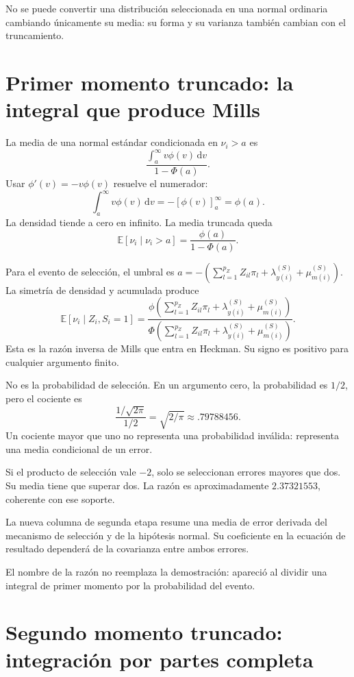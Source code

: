 \documentclass[11pt,a4paper]{article}
\newcommand{\E}{\mathbb E}
\newcommand{\dd}{\,\mathrm d}
\begin{document}
No se puede convertir una distribución
seleccionada en una normal ordinaria
cambiando únicamente su media:
su forma y su varianza
también cambian con el truncamiento.


\clearpage
\section{Primer momento truncado: la integral que produce Mills}

La media de una normal estándar
condicionada en \(\nu_i>a\) es
\[
\frac{\int_a^\infty v\phi(v)\dd v}
{1-\Phi(a)}.
\]
Usar \(\phi'(v)=-v\phi(v)\)
resuelve el numerador:
\[
\int_a^\infty v\phi(v)\dd v
=-[\phi(v)]_a^\infty=\phi(a).
\]
La densidad tiende a cero en infinito.
La media truncada queda
\[
\E[\nu_i\mid\nu_i>a]
=\frac{\phi(a)}{1-\Phi(a)}.
\]

Para el evento de selección,
el umbral es \(a=-\left(\sum_{l=1}^{p_Z}Z_{il}\pi_l+\lambda_{y(i)}^{(S)}+\mu_{m(i)}^{(S)}\right)\).
La simetría de densidad y acumulada produce
\[
\boxed{
\E[\nu_i\mid Z_i,S_i=1]
=\frac{\phi(\sum_{l=1}^{p_Z}Z_{il}\pi_l+\lambda_{y(i)}^{(S)}+\mu_{m(i)}^{(S)})}
{\Phi(\sum_{l=1}^{p_Z}Z_{il}\pi_l+\lambda_{y(i)}^{(S)}+\mu_{m(i)}^{(S)})}}.
\]
Esta es la razón inversa de Mills
que entra en Heckman.
Su signo es positivo para cualquier
argumento finito.

No es la probabilidad de selección.
En un argumento cero,
la probabilidad es \(1/2\),
pero el cociente es
\[
\frac{1/\sqrt{2\pi}}{1/2}
=\sqrt{2/\pi}\approx.79788456.
\]
Un cociente mayor que uno
no representa una probabilidad inválida:
representa una media condicional de un error.

\begin{ejemplo}
Si el producto de selección vale \(-2\),
solo se seleccionan errores mayores que dos.
Su media tiene que superar dos.
La razón es aproximadamente \(2.37321553\),
coherente con ese soporte.
\end{ejemplo}
La nueva columna de segunda etapa
resume una media de error derivada
del mecanismo de selección y
de la hipótesis normal.
Su coeficiente en la ecuación
de resultado dependerá de la
covarianza entre ambos errores.

El nombre de la razón no reemplaza
la demostración: apareció al dividir
una integral de primer momento
por la probabilidad del evento.


\clearpage
\section{Segundo momento truncado: integración por partes completa}
\end{document}
